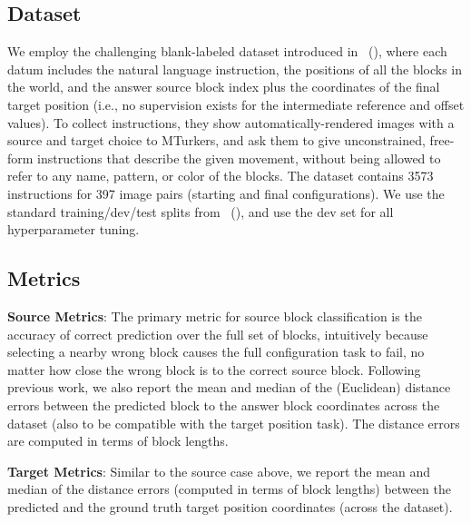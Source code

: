 \documentclass[letterpaper]{article} %
\newcommand{\newcite}[1]{\citeauthor{#1} (\citeyear{#1})}
\begin{document}
\subsection{Dataset}
We employ the challenging blank-labeled dataset introduced in~\newcite{bisk2016natural}, where each datum includes the natural language instruction, the positions of all the blocks in the world, and the answer source block index plus the coordinates of the final target position (i.e., no supervision exists for the intermediate reference and offset values).
%
%
To collect instructions, they show automatically-rendered images with a source and target choice to MTurkers, and ask them to give unconstrained, free-form instructions that describe the given movement, without being allowed to refer to any name, pattern, or color of the blocks.
The dataset contains 3573 instructions for 397 image pairs (starting and final configurations).
%
We use the standard training/dev/test splits from~\newcite{bisk2016natural}, and use the dev set for all hyperparameter tuning.

\subsection{Metrics}

\noindent\textbf{Source Metrics}:
The primary metric for source block classification is the accuracy of correct prediction over the full set of blocks, intuitively because selecting a nearby wrong block causes the full configuration task to fail, no matter how close the wrong block is to the correct source block.
Following previous work, we also report the mean and median of the (Euclidean) distance errors between the predicted block to the answer block coordinates across the dataset (also to be compatible with the target position task). The distance errors are computed in terms of block lengths.


\noindent\textbf{Target Metrics}:
Similar to the source case above, we report the mean and median of the distance errors (computed in terms of block lengths) between the predicted and the ground truth target position coordinates (across the dataset).
\end{document}
